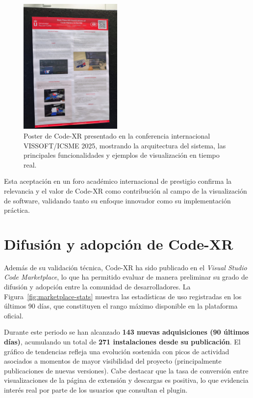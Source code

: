 \documentclass[a4paper, 12pt]{book}
\begin{document}
\begin{figure}[H]
\centering
\includegraphics[width=0.45\textwidth]{img/poster-vissoft-icsme-2025.png}
\caption{Poster de Code-XR presentado en la conferencia internacional VISSOFT/ICSME 2025, mostrando la arquitectura del sistema, las principales funcionalidades y ejemplos de visualización en tiempo real.}
\label{fig:poster-vissoft-icsme}
\end{figure}

Esta aceptación en un foro académico internacional de prestigio confirma la relevancia y el valor de Code-XR como contribución al campo de la visualización de software, validando tanto su enfoque innovador como su implementación práctica.

\section{Difusión y adopción de Code-XR}
\label{sec:adopcion}

Además de su validación técnica, Code-XR ha sido publicado en el \textit{Visual Studio Code Marketplace}, lo que ha permitido evaluar de manera preliminar su grado de difusión y adopción entre la comunidad de desarrolladores. La Figura~\ref{fig:marketplace-stats} muestra las estadísticas de uso registradas en los últimos 90 días, que constituyen el rango máximo disponible en la plataforma oficial.

Durante este periodo se han alcanzado \textbf{143 nuevas adquisiciones (90 últimos días)}, acumulando un total de \textbf{271 instalaciones desde su publicación}. El gráfico de tendencias refleja una evolución sostenida con picos de actividad asociados a momentos de mayor visibilidad del proyecto (principalmente publicaciones de nuevas versiones). Cabe destacar que la tasa de conversión entre visualizaciones de la página de extensión y descargas es positiva, lo que evidencia interés real por parte de los usuarios que consultan el plugin.
\end{document}
